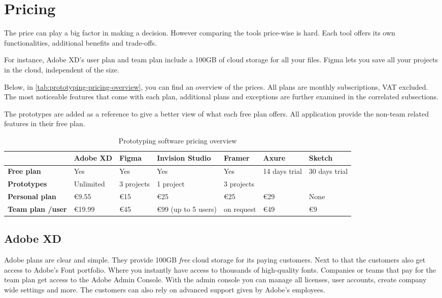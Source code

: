 \section{Pricing}
The price can play a big factor in making a decision. However comparing the tools price-wise is hard. Each tool offers its own functionalities, additional benefits and trade-offs. 

For instance, Adobe XD's user plan and team plan include a 100GB of cloud storage for all your files. Figma lets you save all your projects in the cloud, independent of the size.

Below, in \autoref{tab:prototyping-pricing-overview}, you can find an overview of the prices. All plans are monthly subscriptions, VAT excluded. The most noticeable features that come with each plan, additional plans and exceptions are further examined in the correlated subsections.

The prototypes are added as a reference to give a better view of what each free plan offers. All application provide the non-team related features in their free plan.

\begin{table}[H]
\begin{tabular}{ | l | l | l | l | l | l | l | }
  \toprule
  \textbf{}         & \textbf{Adobe XD}     & \textbf{Figma}    & \textbf{Invision Studio}  & \textbf{Framer}    & \textbf{Axure}   & \textbf{Sketch} \\
  \midrule
  \textbf{Free plan}        & Yes           & Yes               & Yes                       & Yes               & 14 days trial    & 30 days trial  \\
  \textbf{Prototypes}       & Unlimited     & 3 projects        & 1 project                 & 3 projects        &                   &       \\
  \midrule
  \textbf{Personal plan}    & €9.55         & €15               & €25                       & €25               & €29               & None        \\
  \textbf{Team plan /user}  & €19.99        & €45               & €99 (up to 5 users)       & on request        & €49               & €9        \\
  \bottomrule
\end{tabular}
\captionsetup{justification=centering}
\caption{Prototyping software pricing overview\label{tab:prototyping-pricing-overview}}
\centering
\end{table}

\subsection{Adobe XD}
Adobe plans are clear and simple. They provide 100GB \textit{free} cloud storage for its paying customers. Next to that the customers also get access to Adobe's Font portfolio. Where you instantly have access to thousands of high-quality fonts. 
Companies or teams that pay for the team plan get access to the Adobe Admin Console. With the admin console you can manage all licenses, user accounts, create company wide settings and more. The customers can also rely on advanced support given by Adobe's employees.

